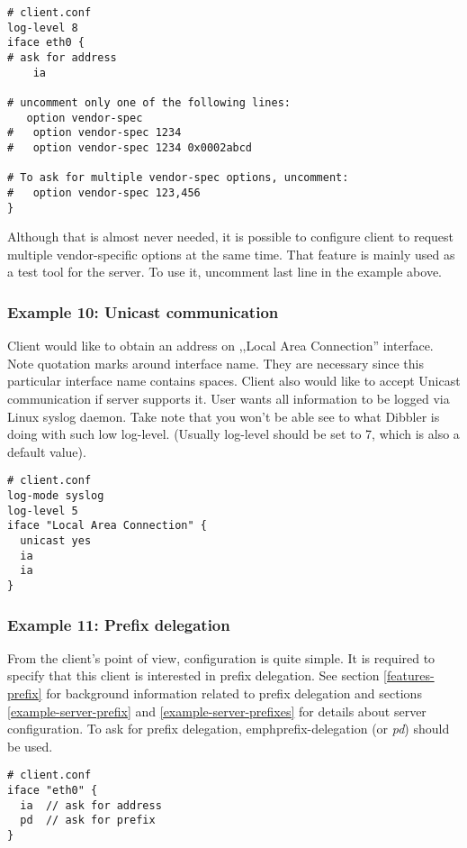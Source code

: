\begin{lstlisting}
# client.conf
log-level 8
iface eth0 {
# ask for address
    ia

# uncomment only one of the following lines:
   option vendor-spec
#   option vendor-spec 1234
#   option vendor-spec 1234 0x0002abcd

# To ask for multiple vendor-spec options, uncomment:
#   option vendor-spec 123,456
}
\end{lstlisting}

Although that is almost never needed, it is possible to configure
client to request multiple vendor-specific options at the same
time. That feature is mainly used as a test tool for the server. To
use it, uncomment last line in the example above.

\subsubsection{Example 10: Unicast communication}

Client would like to obtain an address on ,,Local Area Connection''
interface. Note quotation marks around
interface name. They are necessary since this particular interface name
contains spaces. Client also would like to accept Unicast
communication if server supports it. User wants all information
to be logged via Linux syslog daemon. Take note that you won't be
able see to what Dibbler is doing with such low log-level. (Usually
log-level should be set to 7, which is also a default value).

\begin{lstlisting}
# client.conf
log-mode syslog
log-level 5
iface "Local Area Connection" {
  unicast yes
  ia
  ia
}
\end{lstlisting}

\subsubsection{Example 11: Prefix delegation}
\label{example-client-prefix}
From the client's point of view, configuration is quite simple. It is
required to specify that this client is interested in prefix
delegation. See section \ref{features-prefix} for background
information related to prefix delegation and sections
\ref{example-server-prefix} and \ref{example-server-prefixes} for
details about server configuration. To ask for prefix delegation,
emph{prefix-delegation} (or \emph{pd}) should be used.

\begin{lstlisting}
# client.conf
iface "eth0" {
  ia  // ask for address
  pd  // ask for prefix
}
\end{lstlisting}

